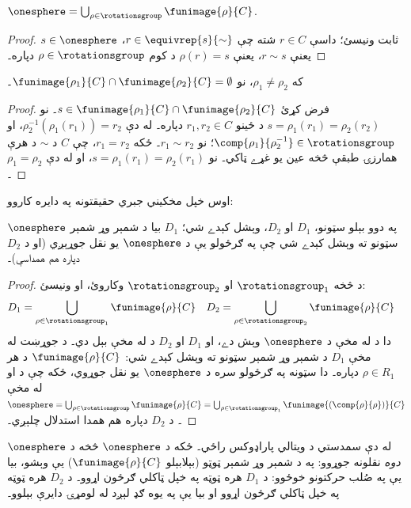 \documentclass[../../../include/open-logic-section]{subfiles}
\begin{document}
\begin{lem}
$\onesphere = \bigcup_{\rho \in \rotationsgroup} \funimage{\rho}{C}$.
\end{lem}

\begin{proof}
$s \in \onesphere$ ثابت ونيسئ؛ داسې $r \in C$ شته چې
$r \in \equivrep{s}{\sim}$، يعنې $r \sim s$، يعنې
$\rho(r) = s$ د کوم $\rho \in \rotationsgroup$ دپاره۔
\end{proof}

\begin{lem}
که $\rho_1 \neq \rho_2$، نو
$\funimage{\rho_1}{C} \cap \funimage{\rho_2}{C} = \emptyset$۔
\end{lem}

\begin{proof}
فرض کړئ $s \in \funimage{\rho_{1}}{C} \cap \funimage{\rho_{2}}{C}$۔
نو $s = \rho_{1}(r_{1}) = \rho_{2}(r_{2})$ د ځينو
$r_{1}, r_{2} \in C$ دپاره۔ له دې
$\rho^{-1}_2(\rho_1(r_1)) = r_2$، او
$\comp{\rho_1}{\rho^{-1}_2} \in \rotationsgroup$؛ نو
$r_{1} \sim r_{2}$۔ ځکه $r_1 = r_2$، چې $C$ د
$\sim$ د هرې همارزۍ طبقې څخه عين يو غړے ټاکي۔
نو $s = \rho_1(r_1) = \rho_2(r_1)$، او له دې
$\rho_1 = \rho_2$۔
\end{proof}

اوس خپل مخکيني جبري حقيقتونه په دايره کاروو:

\begin{lem}
$\onesphere$ په دوو بېلو سټونو، $D_{1}$ او $D_{2}$،
وېشل کېدے شي؛ $D_{1}$ بيا د شمېر وړ شمېر سټونو ته
وېشل کېدے شي چې په ګرځولو يې د $\onesphere$ يو نقل
جوړېږي (او د $D_{2}$ دپاره هم همداسې)۔
\end{lem}

\begin{proof}
د  څخه $\rotationsgroup_{1}$ او
$\rotationsgroup_{2}$ وکاروئ، او ونيسئ:
\begin{align*}
	D_{1} &= \bigcup_{\rho \in \rotationsgroup_1} \funimage{\rho}{C} & 
	D_{2} &= \bigcup_{\rho \in \rotationsgroup_2} \funimage{\rho}{C}
\end{align*}
دا د  له مخې د $\onesphere$ وېش دے،
او $D_1$ او $D_2$ د  له مخې بېل دي۔
د جوړښت له مخې $D_1$ د شمېر وړ شمېر سټونو ته وېشل
کېدے شي: $\funimage{\rho}{C}$ د هر
$\rho \in R_1$ دپاره۔ دا سټونه په ګرځولو سره د
$\onesphere$ يو نقل جوړوي، ځکه چې د
 او  له مخې
$\onesphere = \bigcup_{\rho \in
\rotationsgroup}\funimage{\rho}{C} = \bigcup_{\rho \in
\rotationsgroup_1}\funimage{(\comp{\rho}{\rho})}{C}$۔
د $D_2$ دپاره هم همدا استدلال چلېږي۔ \end{proof}\noindent
له دې سمدستي د ويتالي پاراډوکس راځي۔ ځکه د
$\onesphere$ څخه د $\onesphere$ \emph{دوه} نقلونه
جوړوو: په د شمېر وړ شمېر ټوټو (بېلابېلو
$\funimage{\rho}{C}$) يې وېشو، بيا يې په صُلب
حرکتونو خوځوو: د $D_1$ هره ټوټه په خپل ټاکلي ګرځون اړوو۔ د $D_2$
هره ټوټه په خپل ټاکلي ګرځون اړوو او بيا يې په يوه ګډ
لېږد له لومړۍ دايرې بېلوو۔
\end{document}
